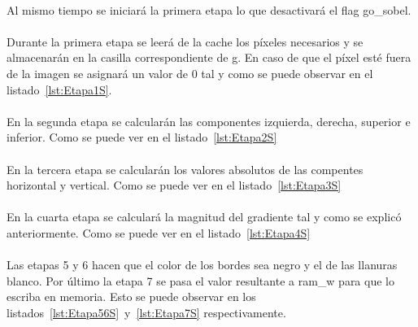 \documentclass[a4paper,12pt,titlepage,final]{book}
\begin{document}
\paragraph{}
Al mismo tiempo se iniciará la primera etapa lo que desactivará el flag go\_sobel.

\paragraph{}
Durante la primera etapa se leerá de la cache los píxeles necesarios y se almacenarán en la casilla correspondiente de g. En caso de que el píxel esté fuera de la imagen se asignará un valor de 0 tal y como se puede observar en el listado~\ref{lst:Etapa1S}.



\paragraph{}
En la segunda etapa se calcularán las componentes izquierda, derecha, superior e inferior. Como se puede ver en el listado~\ref{lst:Etapa2S}



\paragraph{}
En la tercera etapa se calcularán los valores absolutos de las compentes horizontal y vertical. Como se puede ver en el listado~\ref{lst:Etapa3S}



\paragraph{}
En la cuarta etapa se calculará la magnitud del gradiente tal y como se explicó anteriormente. Como se puede ver en el listado~\ref{lst:Etapa4S}



\paragraph{}
Las etapas 5 y 6 hacen que el color de los bordes sea negro y el de las llanuras blanco. Por último la etapa 7 se pasa el valor resultante a ram\_w para que lo escriba en memoria. Esto se puede observar en los listados~\ref{lst:Etapa56S}~y~\ref{lst:Etapa7S} respectivamente.
\end{document}
